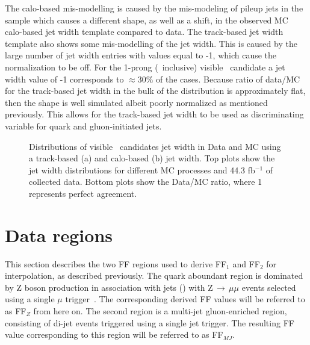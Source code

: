 	 The calo-based mis-modelling is caused by the mis-modeling of pileup jets in the sample which causes a different shape, as well as a shift, in the observed \ac{MC} calo-based jet width template compared to data. The track-based jet width template also shows some mis-modelling of the jet width. This is caused by the large number of jet width entries with values equal to -1, which cause the normalization to be off. For the 1-prong (\pt\ inclusive) visible \htau\ candidate a jet width value of -1 corresponds to $\approx30\%$ of the cases. Because ratio of data/MC for the track-based jet width in the bulk of the distribution is approximately flat, then the shape is well simulated albeit poorly normalized as mentioned previously. This allows for the track-based jet width to be used as discriminating variable for quark and gluon-initiated jets.
	 \begin{figure}[!hbt]
	\begin{center}
			 				\hspace{0.05\textwidth}
							\hspace{0.05\textwidth}
	\end{center}	
	\caption{Distributions of visible \htau\ candidates jet width in Data and MC using a track-based (a) and calo-based (b) jet width. Top plots show the jet width distributions for different MC processes and 44.3 fb$^{-1}$ of collected data. Bottom plots show the Data/MC ratio, where 1 represents perfect agreement.}
	\label{fig:jet_width_modelling}
	\end{figure}
	
	
	
	\section{Data regions} 
	\label{sec:datareg}
	This section describes the two \ac{FF} regions used to derive FF$_1$ and FF$_2$ for interpolation, as described previously.
	The quark aboundant region is dominated by Z boson production in association with jets (\Zjets) with Z$\,\rightarrow\,\mu\mu$ events selected using a single $\mu$ trigger~\cite{CMS-PAS-JME-16-003}.
	The corresponding derived \ac{FF} values will be referred to as FF$_Z$ from here on.
	 The second region is a multi-jet gluon-enriched region, consisting of di-jet events triggered using a single jet trigger. The resulting \ac{FF} value corresponding to this region will be referred to as FF$_{MJ}$.
	 
